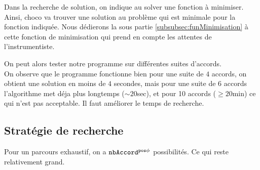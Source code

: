 Dans la recherche de solution, on indique au solver une fonction à minimiser.
Ainsi, choco va trouver une solution au problème qui est minimale pour la 
fonction indiquée. Nous dédierons la sous partie 
\ref{subsubsec:funMinimisation} à cette fonction de 
minimisation qui prend en compte les attentes de l'instrumentiste.

On peut alors tester notre programme sur différentes suites d'accords.\\
On observe que le programme fonctionne bien pour une suite de $4$ accords, on
obtient une solution en moins de $4$ secondes, mais pour une suite de $6$ 
accords l'algorithme met déja plus longtemps ($\sim 20$sec), et pour 10 accords
($\geq20$min) ce qui n'est pas acceptable. Il faut améliorer le temps de
recherche.

\subsection{Stratégie de recherche}
\label{subsec:strategie}

Pour un parcours exhaustif, on a $\texttt{nbAccord}^{\texttt{pos}\phi}$
possibilités. Ce qui reste relativement grand.

